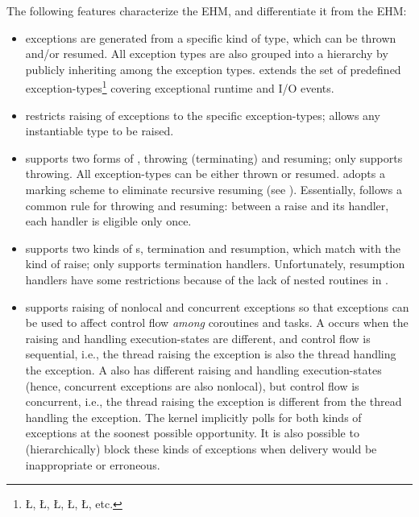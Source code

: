 \documentclass[openright,twoside]{report}
\begin{document}
The following features characterize the \uC EHM, and differentiate it from the \CC EHM:
\begin{itemize}
\item
\uC exceptions are generated from a specific kind of type, which can be thrown and/or resumed.
All exception types are also grouped into a hierarchy by publicly inheriting among the exception types.
\uC extends the \CC set of predefined exception-types\footnote{\LGinlinetrue\LGbegin\lgrinde\L{}\endlgrinde\LGend{}, \LGinlinetrue\LGbegin\lgrinde\L{}\endlgrinde\LGend{}, \LGinlinetrue\LGbegin\lgrinde\L{}\endlgrinde\LGend{}, \LGinlinetrue\LGbegin\lgrinde\L{}\endlgrinde\LGend{}, \LGinlinetrue\LGbegin\lgrinde\L{}\endlgrinde\LGend{}, etc.} covering \uC exceptional runtime and I/O events.
\item
\uC restricts raising of exceptions to the specific exception-types;
\CC allows any instantiable type to be raised.
\item
\uC supports two forms of , throwing (terminating) and resuming;
\CC only supports throwing.
All \uC exception-types can be either thrown or resumed.
\uC adopts a marking scheme to eliminate recursive resuming (see ).
Essentially, \uC follows a common rule for throwing and resuming: between a raise and its handler, each handler is eligible only once.
\item
\uC supports two kinds of s, termination and resumption, which match with the kind of raise;
\CC only supports termination handlers.
Unfortunately, resumption handlers have some restrictions because of the lack of nested routines in \CC.
\item
\uC supports raising of nonlocal and concurrent exceptions so that exceptions can be used to affect control flow \emph{among} coroutines and tasks.
A  occurs when the raising and handling execution-states are different, and control flow is sequential, i.e., the thread raising the exception is also the thread handling the exception.
A  also has different raising and handling execution-states (hence, concurrent exceptions are also nonlocal), but control flow is concurrent, i.e., the thread raising the exception is different from the thread handling the exception.
The \uC kernel implicitly polls for both kinds of exceptions at the soonest possible opportunity.
It is also possible to (hierarchically) block these kinds of exceptions when delivery would be inappropriate or erroneous.
\end{itemize}
\end{document}
